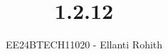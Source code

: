 \documentclass[journal]{IEEEtran}
\begin{document}

\vspace{3cm}

\title{1.2.12}
\author{EE24BTECH11020 - Ellanti Rohith
}
{\let\newpage\relax\maketitle}

\renewcommand{\thefigure}{\theenumi}
\renewcommand{\thetable}{\theenumi}
\setlength{\intextsep}{10pt} %


\renewcommand{\thetable}{\theenumi}
\end{document}
